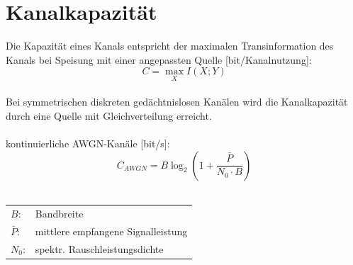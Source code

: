 \section{Kanalkapazität}
Die Kapazität eines Kanals entspricht der maximalen Transinformation des Kanals 
bei Speisung mit einer angepassten Quelle [bit/Kanalnutzung]:
\[ C = \max_X I(X;Y) \]
~\\
Bei symmetrischen diskreten gedächtnislosen Kanälen wird die Kanalkapazität 
durch eine Quelle mit Gleichverteilung erreicht. 
\\\\
kontinuierliche AWGN-Kanäle [bit/s]:
\[ C_{AWGN} = B\log_2\left(1+\frac{\bar{P}}{N_0 \cdot B}\right) \]
~\\
\begin{footnotesize}
\begin{tabular}{ll}
	$B$:	& Bandbreite \\
	$\bar{P}$:	& mittlere empfangene Signalleistung \\
	$N_0$:&	spektr. Rauschleistungsdichte
\end{tabular}
\end{footnotesize}